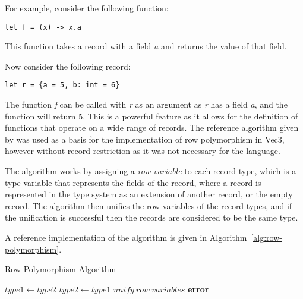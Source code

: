 For example, consider the following function:

\begin{verbatim}
let f = (x) -> x.a
\end{verbatim}

This function takes a record with a field \textit{a} and returns the value of that field.

Now consider the following record:

\begin{verbatim}
let r = {a = 5, b: int = 6}
\end{verbatim}

The function \textit{f} can be called with \textit{r} as an argument as \textit{r} has a field \textit{a}, and the
function will return 5.
This is a powerful feature as it allows for the definition of functions that operate on a wide range of records.
The reference algorithm given by \citet{morris2019abstracting} was used as a basis for the implementation of row
polymorphism in Vec3, however without record restriction as it was not necessary for the language.

The algorithm works by assigning a \textit{row variable} to each record type, which is a type variable that represents
the fields of the record, where a record is represented in the type system as an extension of another record, or the empty record.
The algorithm then unifies the row variables of the record types, and if the unification is successful then the
records are considered to be the same type.

A reference implementation of the algorithm is given in Algorithm~\ref{alg:row-polymorphism}.

\begin{algorithm}
    \caption{Row Polymorphism Algorithm}
    \begin{algorithmic}
                \State $type1 \gets type2$
            \EndIf
                \State $type2 \gets type1$
            \EndIf
                \State $unify\ row\ variables$
            \EndIf
                \State \textbf{error}
            \EndIf
        \EndFunction
    \end{algorithmic}
    \label{alg:row-polymorphism}
\end{algorithm}

